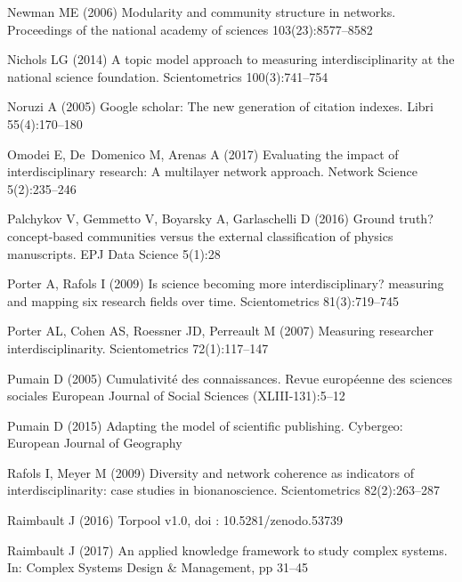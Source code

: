 \documentclass[10pt]{article}
\begin{document}
\begin{thebibliography}{84}
Newman ME (2006) Modularity and community structure in networks. Proceedings of
  the national academy of sciences 103(23):8577--8582

Nichols LG (2014) A topic model approach to measuring interdisciplinarity at
  the national science foundation. Scientometrics 100(3):741--754

Noruzi A (2005) Google scholar: The new generation of citation indexes. Libri
  55(4):170--180

Omodei E, De~Domenico M, Arenas A (2017) Evaluating the impact of
  interdisciplinary research: A multilayer network approach. Network Science
  5(2):235--246

Palchykov V, Gemmetto V, Boyarsky A, Garlaschelli D (2016) Ground truth?
  concept-based communities versus the external classification of physics
  manuscripts. EPJ Data Science 5(1):28

Porter A, Rafols I (2009) Is science becoming more interdisciplinary? measuring
  and mapping six research fields over time. Scientometrics 81(3):719--745

Porter AL, Cohen AS, Roessner JD, Perreault M (2007) Measuring researcher
  interdisciplinarity. Scientometrics 72(1):117--147

Pumain D (2005) Cumulativit{\'e} des connaissances. Revue europ{\'e}enne des
  sciences sociales European Journal of Social Sciences (XLIII-131):5--12

Pumain D (2015) Adapting the model of scientific publishing. Cybergeo: European
  Journal of Geography

Rafols I, Meyer M (2009) Diversity and network coherence as indicators of
  interdisciplinarity: case studies in bionanoscience. Scientometrics
  82(2):263--287

Raimbault J (2016) Torpool v1.0, doi : 10.5281/zenodo.53739

Raimbault J (2017) An applied knowledge framework to study complex systems. In:
  Complex Systems Design \& Management, pp 31--45


\end{thebibliography}
\end{document}
